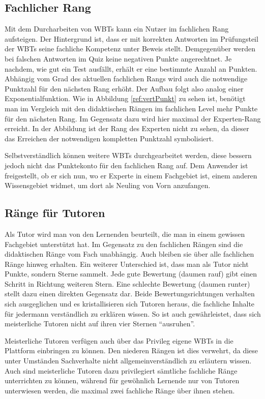 \subsection{Fachlicher Rang}\label{ref:rankTopic}
Mit dem Durcharbeiten von WBTs kann ein Nutzer im fachlichen Rang aufsteigen.
Der Hintergrund ist, dass er mit korrekten Antworten im Prüfungsteil der WBTs
seine fachliche Kompetenz unter Beweis stellt. Demgegenüber werden bei falschen
Antworten im Quiz keine negativen Punkte angerechtnet. Je nachdem, wie gut ein
Test ausfällt, erhält er eine bestimmte Anzahl an Punkten. Abhängig vom Grad des
aktuellen fachlichen Rangs wird auch die notwendige Punktzahl für den nächsten
Rang erhöht. Der Aufbau folgt also analog einer Exponentialfunktion. Wie in
Abbildung \ref{ref:vertPunkt} zu sehen ist, benötigt man im Vergleich mit den
didaktischen Rängen im fachlichen Level mehr Punkte für den nächsten Rang. Im
Gegensatz dazu wird hier maximal der Experten-Rang erreicht. In der Abbildung
ist der Rang des Experten nicht zu sehen, da dieser das Erreichen der
notwendigen kompletten Punktzahl symbolisiert.

Selbstverständlich können weitere WBTs durchgearbeitet werden, diese bessern
jedoch nicht das Punktekonto für den fachlichen Rang auf. Dem Anwender ist
freigestellt, ob er sich nun, wo er Experte in einem Fachgebiet ist, einem
anderen Wissensgebiet widmet, um dort als Neuling von Vorn anzufangen.

\subsection{Ränge für Tutoren}\label{ref:rankTeach}
Als Tutor wird man von den Lernenden beurteilt, die man in einem gewissen
Fachgebiet unterstützt hat. Im Gegensatz zu den fachlichen Rängen sind die
didaktischen Ränge vom Fach unabhängig. Auch bleiben sie über alle fachlichen
Ränge hinweg erhalten. Ein weiterer Unterschied ist, dass man als Tutor nicht
Punkte, sondern Sterne sammelt. Jede gute Bewertung (daumen rauf) gibt einen
Schritt in Richtung weiteren Stern. Eine schlechte Bewertung (daumen runter)
stellt dazu einen direkten Gegensatz dar. Beide Bewertungsrichtungen verhalten
sich ausgeglichen und es kristallisieren sich Tutoren heraus, die fachliche
Inhalte für jedermann verständlich zu erklären wissen. So ist auch
gewährleistet, dass sich meisterliche Tutoren nicht auf ihren vier Sternen
"`ausruhen"'. 

Meisterliche Tutoren verfügen auch über das Privileg eigene WBTs in die
Plattform einbringen zu können. Den niederen Rängen ist dies verwehrt, da diese
unter Umständen Sachverhalte nicht allgemeinverständlich zu erläutern wissen.
Auch sind meisterliche Tutoren dazu privilegiert sämtliche fachliche Ränge
unterrichten zu können, während für gewöhnlich Lernende nur von Tutoren
unterwiesen werden, die maximal zwei fachliche Ränge über ihnen stehen.

